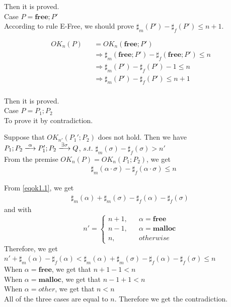 \documentclass[english]{jssst_ppl} %
\newcommand\Malloc{\mathbf{malloc}}
\newcommand\Free{\mathbf{free}}
\theoremstyle{definition}
\begin{document}
Then it is proved.\\

\noindent Case $P = \Free;P'$ \\

According to rule E-Free, we should prove $\sharp_{m}(P') - \sharp_{f}(P') \le n+1$.

\begin{eqnarray*}
  OK_{n}(P)  & & =  OK_{n}(\Free;P')\\
  & &\Rightarrow  \sharp_{m}(\Free;P') - \sharp_{f}(\Free;P') \le n \\
  & & \Rightarrow \sharp_{m}(P')  - \sharp_{f}(P') - 1  \le n\\
  & & \Rightarrow \sharp_{m}(P')  - \sharp_{f}(P') \le n+1\\
\end{eqnarray*}

Then it is proved. \\

\noindent Case $P = P_{1};P_{2}$\\

To prove it by contradiction.

Suppose that $OK_{n'}(P_{1}';P_{2})$ does not hold. Then we have 
$P_{1};P_{2} \xlongrightarrow{\alpha} P_{1}';P_{2} \xlongrightarrow{\exists \sigma} Q$, $s.t.$ $\sharp_{m}(\sigma) - \sharp_{f}(\sigma) > n'$\\

From the premise $OK_{n}(P) = OK_{n}(P_{1};P_{2})$, we get 
\setcounter{equation}{0}
\begin{align}
  &  \sharp_{m}(\alpha \cdot \sigma) - \sharp_{f}(\alpha \cdot \sigma) \le n \label{eqok1.1}
\end{align}

From \eqref{eqok1.1}, we get
\begin{align}
\sharp_{m}(\alpha) + \sharp_{m}(\sigma) - \sharp_{f}(\alpha) - \sharp_{f}(\sigma) \  \label{eqok1.2}
\end{align}
and with
$$
   n'=\left\{
   \begin{aligned}
     n + 1, && \alpha = \Free \\
     n - 1,  && \alpha = \Malloc  \\
     n ,      && otherwise
   \end{aligned}
   \right.
$$
Therefore, we get \\
$n' + \sharp_{m}(\alpha) - \sharp_{f}(\alpha) < \sharp_{m}(\alpha) + \sharp_{m}(\sigma) - \sharp_{f}(\alpha) - \sharp_{f}(\sigma) \le n $ \\
When $\alpha = \Free$, we get that $n + 1 - 1 < n$\\
When $\alpha = \Malloc$, we get that $ n - 1 + 1 < n $ \\
When $ \alpha = other$,  we  get that $ n < n $ \\
 All of the three cases are equal to $n$. Therefore we get the contradiction.
\end{document}
